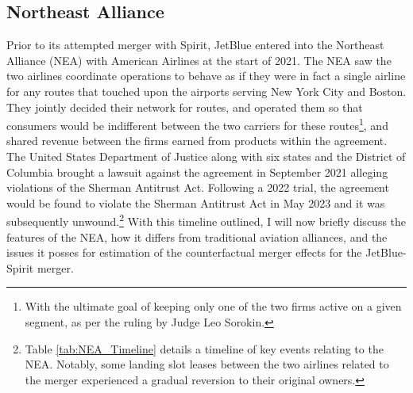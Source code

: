 \documentclass{article}
\begin{document}
	\subsection{Northeast Alliance}
	\label{sec:Setting_NEA}
	
	Prior to its attempted merger with Spirit, JetBlue entered into the Northeast Alliance (NEA) with American Airlines at the start of 2021. The NEA saw the two airlines coordinate operations to behave as if they were in fact a single airline for any routes that touched upon the airports serving New York City and Boston. They jointly decided their network for routes, and operated them so that consumers would be indifferent between the two carriers for these routes\footnote{With the ultimate goal of keeping only one of the two firms active on a given segment, as per the ruling by Judge Leo Sorokin.}, and shared revenue between the firms earned from products within the agreement. The United States Department of Justice along with six states and the District of Columbia brought a lawsuit against the agreement in September 2021 alleging violations of the Sherman Antitrust Act. Following a 2022 trial, the agreement would be found to violate the Sherman Antitrust Act in May 2023 and it was subsequently unwound\citep{rennison_jetblue-american_2023, rains_what_2023}.\footnote{Table \ref{tab:NEA_Timeline} details a timeline of key events relating to the NEA. Notably, some landing slot leases between the two airlines related to the merger experienced a gradual reversion to their original owners.} With this timeline outlined, I will now briefly discuss the features of the NEA, how it differs from traditional aviation alliances, and the issues it posses for estimation of the counterfactual merger effects for the JetBlue-Spirit merger. 
\end{document}
